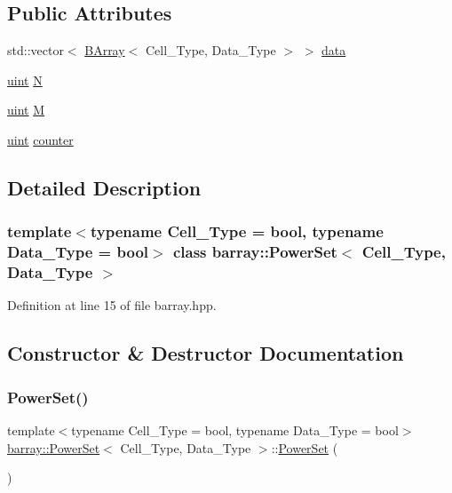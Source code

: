 \subsection*{Public Attributes}
\begin{DoxyCompactItemize}
\item 
std\+::vector$<$ \hyperlink{classbarray_1_1_b_array}{B\+Array}$<$ Cell\+\_\+\+Type, Data\+\_\+\+Type $>$ $>$ \hyperlink{classbarray_1_1_power_set_a6f01b8c9f6b8931d50e9b50a59816357}{data}
\item 
\hyperlink{namespacebarray_af9756a31953db233f80a9cfe1ef31c32}{uint} \hyperlink{classbarray_1_1_power_set_a778fd87c623a64fa4b4f65c1d4f1b0f3}{N}
\item 
\hyperlink{namespacebarray_af9756a31953db233f80a9cfe1ef31c32}{uint} \hyperlink{classbarray_1_1_power_set_a3b62b4eb9889b2c6eca4b58bc6890892}{M}
\item 
\hyperlink{namespacebarray_af9756a31953db233f80a9cfe1ef31c32}{uint} \hyperlink{classbarray_1_1_power_set_af4dc47b2c5fc2a740fc5ae3f82d80126}{counter}
\end{DoxyCompactItemize}


\subsection{Detailed Description}
\subsubsection*{template$<$typename Cell\+\_\+\+Type = bool, typename Data\+\_\+\+Type = bool$>$\newline
class barray\+::\+Power\+Set$<$ Cell\+\_\+\+Type, Data\+\_\+\+Type $>$}



Definition at line 15 of file barray.\+hpp.



\subsection{Constructor \& Destructor Documentation}
\mbox{\label{classbarray_1_1_power_set_abcdc2405c2bbcad64bc1cd39cb0569ad}} 
\subsubsection{\texorpdfstring{Power\+Set()}{PowerSet()}\hspace{0.1cm}{\footnotesize\ttfamily [1/2]}}
{\footnotesize\ttfamily template$<$typename Cell\+\_\+\+Type  = bool, typename Data\+\_\+\+Type  = bool$>$ \\
\hyperlink{classbarray_1_1_power_set}{barray\+::\+Power\+Set}$<$ Cell\+\_\+\+Type, Data\+\_\+\+Type $>$\+::\hyperlink{classbarray_1_1_power_set}{Power\+Set} (\begin{DoxyParamCaption}{ }\end{DoxyParamCaption})\hspace{0.3cm}{\ttfamily [inline]}}



